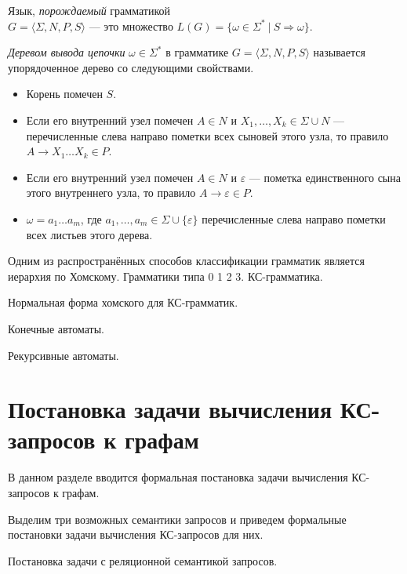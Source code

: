 \begin{definition}
	Язык, \textit{порождаемый} грамматикой \\ $G = \langle \Sigma, N, P, S \rangle$ --- это множество $L(G)  = \{ \omega \in \Sigma^*~|~S \Rightarrow \omega \}$.
\end{definition}

\begin{definition}
	\textit{Деревом вывода цепочки} $\omega \in \Sigma^*$ в грамматике $G=\langle \Sigma, N, P, S \rangle$ называется упорядоченное дерево со следующими свойствами. 
	\begin{itemize}
		\item Корень помечен $S$.
		
		\item Если его внутренний узел помечен $A \in N$ и $X_1, \ldots , X_k \in \Sigma \cup N$ ---   перечисленные слева направо пометки всех сыновей этого узла, то правило $A \rightarrow X_1 \ldots X_k \in P$.
		
		\item Если его внутренний узел помечен $A \in N$ и $\varepsilon$ --- пометка единственного сына этого внутреннего узла, то правило $A \rightarrow \varepsilon \in P$.
		
		\item $\omega = a_1 \ldots a_m$, где $a_1, \ldots , a_m \in \Sigma \cup \{\varepsilon\} $ перечисленные слева направо пометки всех листьев этого дерева.
		
	\end{itemize}
\end{definition}


Одним из распространённых способов классификации грамматик является иерархия по Хомскому. Грамматики типа 0 1 2 3. КС-грамматика.

Нормальная форма хомского для КС-грамматик.

Конечные автоматы.

Рекурсивные автоматы.


\section{Постановка задачи вычисления КС-запросов к графам}\label{sec:ch1/sec3}
В данном разделе вводится формальная постановка задачи вычисления КС-запросов к графам.

Выделим три возможных семантики запросов и приведем формальные постановки задачи вычисления КС-запросов для них.

Постановка задачи с реляционной семантикой запросов.

